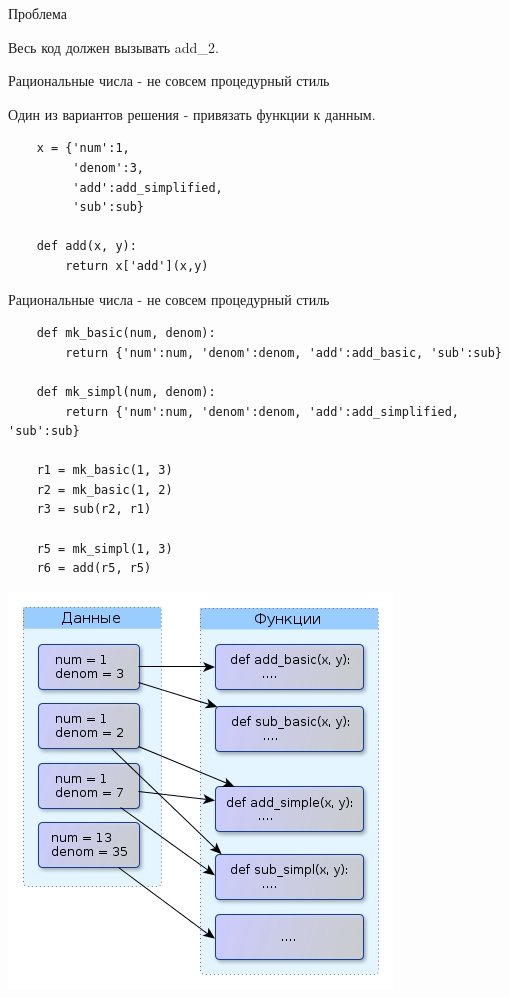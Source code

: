 \documentclass{article}
\begin{document}
\begin{center} Проблема \end{center} 
Весь код должен вызывать add\_2.
\newpage

\begin{center} Рациональные числа - не совсем процедурный стиль \end{center}
Один из вариантов решения - привязать функции к данным. \\
\begin{lstlisting}
    x = {'num':1, 
         'denom':3, 
         'add':add_simplified, 
         'sub':sub}

    def add(x, y): 
        return x['add'](x,y)
\end{lstlisting}
\newpage

\begin{center} Рациональные числа - не совсем процедурный стиль \end{center}
\begin{lstlisting}
    def mk_basic(num, denom):
        return {'num':num, 'denom':denom, 'add':add_basic, 'sub':sub}

    def mk_simpl(num, denom):
        return {'num':num, 'denom':denom, 'add':add_simplified, 'sub':sub}

    r1 = mk_basic(1, 3)
    r2 = mk_basic(1, 2)
    r3 = sub(r2, r1)

    r5 = mk_simpl(1, 3)
    r6 = add(r5, r5)
\end{lstlisting}
\newpage

\begin{center} \includegraphics{images/semi_OOP_style.jpg} \end{center} 
\newpage
\end{document}
